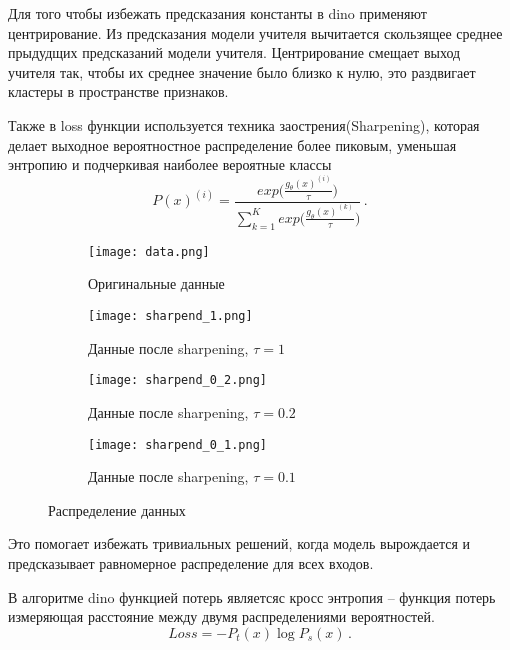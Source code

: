 \documentclass[../part_1.tex]{subfiles}
\begin{document}
    \par Для того чтобы избежать предсказания константы в \acrshort{dino} применяют центрирование. Из предсказания модели учителя вычитается скользящее среднее прыдудщих предсказаний модели учителя. Центрирование смещает выход учителя так, чтобы их среднее значение было близко к нулю, это раздвигает кластеры в пространстве признаков.
    \par Также в loss функции используется техника заострения(Sharpening), которая делает выходное вероятностное распределение более пиковым, уменьшая энтропию и подчеркивая наиболее вероятные классы
    \begin{equation}
        \label{sharpening}
        P(x)^{(i)} = \frac{\displaystyle exp\Bigg(\frac{g_\theta(x)^{(i)}}{\tau}\Bigg)}{\displaystyle \sum^K_{k=1}exp\Bigg(\frac{g_\theta(x)^{(k)}}{\tau}\Bigg)}\,.
    \end{equation}

    \begin{figure}[htbp]
        \centering
        \begin{subfigure}{.49\textwidth}
            \centering
            \texttt{[image: data.png]}  
            \caption{Оригинальные данные}
        \end{subfigure}
        \hfill
        \begin{subfigure}{.49\textwidth}
            \centering
            \texttt{[image: sharpend\_1.png]}  
            \caption{Данные после sharpening, $\tau = 1$}
        \end{subfigure}
        \vspace{1cm}
        \begin{subfigure}{.49\textwidth}
            \centering
            \texttt{[image: sharpend\_0\_2.png]}  
            \caption{Данные после sharpening, $\tau = 0.2$}
        \end{subfigure}
        \hfill
        \begin{subfigure}{.49\textwidth}
            \centering
            \texttt{[image: sharpend\_0\_1.png]}  
            \caption{Данные после sharpening, $\tau = 0.1$}
        \end{subfigure}
        \caption{Распределение данных}
    \end{figure}

    \par Это помогает избежать тривиальных решений, когда модель вырождается  и предсказывает равномерное распределение для всех входов.
    \par В алгоритме \acrshort{dino} функцией потерь являетсяс кросс энтропия -- функция потерь измеряющая расстояние между двумя распределениями вероятностей.
    \begin{equation}
        \label{cross_entropy}
        Loss = -P_t(x) \log P_s(x)\,.
    \end{equation}
\end{document}
